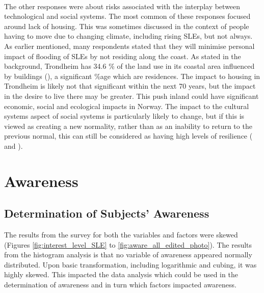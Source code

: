\paragraph{}
The other responses were about risks associated with the interplay between technological and social systems. The most common of these responses focused around lack of housing. This was sometimes discussed in the context of people having to move due to changing climate, including rising SLEs, but not always.  As earlier mentioned, many respondents stated that they will minimise personal impact of flooding of SLEs by not residing along the coast.  As stated in the background, Trondheim has 34.6 \% of the land use in its coastal area influenced by buildings (\cite{engebakken_construction_2022}), a significant \%age which are residences. The impact to housing in Trondheim is likely not that significant within the next 70 years, but the impact in the desire to live there may be greater. This push inland could have significant economic, social and ecological impacts in Norway. The impact to the cultural systems aspect of social systems is particularly likely to change, but if this is viewed as creating a new normality, rather than as an inability to return to the previous normal, this can still be considered as having high levels of resilience (\cite{cutter_place-based_2008} and \cite{cutter_community_2020}).
\paragraph{}




\section{Awareness} \label{discuss-aware}

\subsection{Determination of Subjects' Awareness}
The results from the survey for both the variables and factors were skewed (Figures \ref{fig:interest_level_SLE} to \ref{fig:aware_all_edited_photo}). The results from the histogram analysis is that no variable of awareness appeared normally distributed. Upon basic transformation, including logarithmic and cubing, it was highly skewed. This impacted the data analysis which could be used in the determination of awareness and in turn which factors impacted awareness. 

